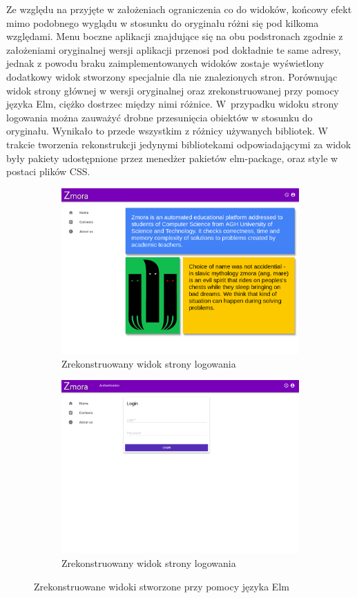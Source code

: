 Ze względu na przyjęte w założeniach ograniczenia co do widoków, końcowy efekt mimo podobnego wyglądu w stosunku do oryginału różni się pod kilkoma względami. Menu boczne aplikacji znajdujące się na obu podstronach zgodnie z założeniami oryginalnej wersji aplikacji przenosi pod dokładnie te same adresy, jednak z powodu braku zaimplementowanych widoków zostaje wyświetlony dodatkowy widok stworzony specjalnie dla nie znalezionych stron. Porównując widok strony głównej w wersji oryginalnej oraz zrekonstruowanej przy pomocy języka Elm, ciężko dostrzec między nimi różnice. W~przypadku widoku strony logowania można zauważyć drobne przesunięcia obiektów w stosunku do oryginału. Wynikało to przede wszystkim z różnicy używanych bibliotek. W trakcie tworzenia rekonstrukcji jedynymi bibliotekami odpowiadającymi za widok były pakiety udostępnione przez menedżer pakietów elm-package, oraz style w postaci plików CSS.
\begin{figure}[h]
	\begin{subfigure}{0.5\textwidth}
		\centering
		\includegraphics[width=0.9\linewidth]{images/homepage_elm}
		\caption{Zrekonstruowany widok strony logowania}
		\label{fig:homElm}
	\end{subfigure}%
	\begin{subfigure}{0.5\textwidth}
		\centering
		\includegraphics[width=0.9\linewidth]{images/login_elm}
		\caption{Zrekonstruowany widok strony logowania}
		\label{fig:logElm}
	\end{subfigure}
	\caption{Zrekonstruowane widoki stworzone przy pomocy języka Elm}
	\label{fig:elmView}
\end{figure}

